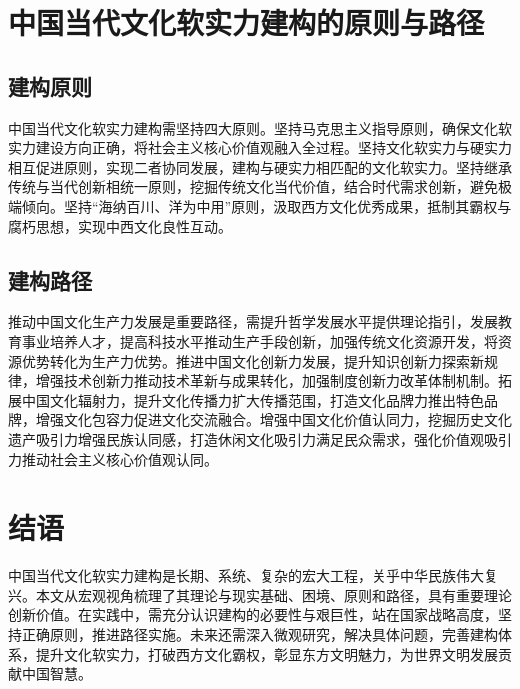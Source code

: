 \documentclass{article}
\begin{document}
\section{中国当代文化软实力建构的原则与路径}
\subsection{建构原则}
中国当代文化软实力建构需坚持四大原则。坚持马克思主义指导原则，确保文化软实力建设方向正确，将社会主义核心价值观融入全过程。坚持文化软实力与硬实力相互促进原则，实现二者协同发展，建构与硬实力相匹配的文化软实力。坚持继承传统与当代创新相统一原则，挖掘传统文化当代价值，结合时代需求创新，避免极端倾向。坚持“海纳百川、洋为中用”原则，汲取西方文化优秀成果，抵制其霸权与腐朽思想，实现中西文化良性互动。

\subsection{建构路径}
推动中国文化生产力发展是重要路径，需提升哲学发展水平提供理论指引，发展教育事业培养人才，提高科技水平推动生产手段创新，加强传统文化资源开发，将资源优势转化为生产力优势。推进中国文化创新力发展，提升知识创新力探索新规律，增强技术创新力推动技术革新与成果转化，加强制度创新力改革体制机制。拓展中国文化辐射力，提升文化传播力扩大传播范围，打造文化品牌力推出特色品牌，增强文化包容力促进文化交流融合。增强中国文化价值认同力，挖掘历史文化遗产吸引力增强民族认同感，打造休闲文化吸引力满足民众需求，强化价值观吸引力推动社会主义核心价值观认同。

\section{结语}
中国当代文化软实力建构是长期、系统、复杂的宏大工程，关乎中华民族伟大复兴。本文从宏观视角梳理了其理论与现实基础、困境、原则和路径，具有重要理论创新价值。在实践中，需充分认识建构的必要性与艰巨性，站在国家战略高度，坚持正确原则，推进路径实施。未来还需深入微观研究，解决具体问题，完善建构体系，提升文化软实力，打破西方文化霸权，彰显东方文明魅力，为世界文明发展贡献中国智慧。
\end{document}
